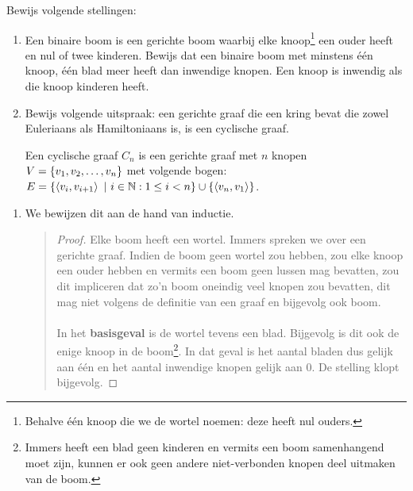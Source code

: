 \documentclass{article}
\begin{document}
\begin{question}[Beslisbaarheid]
\begin{answer}
\begin{itemize}
\end{itemize}
\end{answer}
\end{question}

\begin{question}[Grafentheorie]
Bewijs volgende stellingen:
\begin{enumerate}
\item Een binaire boom is een gerichte boom waarbij elke knoop\footnote{Behalve \'e\'en knoop die we de wortel noemen: deze heeft nul ouders.} een
ouder heeft en nul of twee kinderen. Bewijs dat een binaire boom met
minstens \'e\'en knoop, \'e\'en blad meer heeft dan inwendige knopen.
Een knoop is inwendig als die knoop kinderen heeft.

\item Bewijs volgende uitspraak: een gerichte graaf die een kring
bevat die zowel Euleriaans als Hamiltoniaans is, is een cyclische
graaf.
  \begin{definition}
   Een cyclische graaf $C_n$ is een gerichte graaf met $n$ knopen $V=\left\{ v_1,v_2,\ldots,v_n \right\}$ met volgende bogen: $E=\left\{ \left\langle v_i,v_{i+1} \right\rangle\ |\ i\in\mathbb{N}:1\leq i< n \right\}\cup\left\{ \left\langle v_n,v_1 \right\rangle \right\}$.
  \end{definition}
\end{enumerate}
\begin{answer}
\begin{enumerate}
 \item We bewijzen dit aan de hand van inductie.
 \begin{quote}\begin{proof}
  Elke boom heeft een wortel. Immers spreken we over een gerichte graaf. Indien de boom geen wortel zou hebben, zou elke knoop een ouder hebben en vermits een boom geen lussen mag bevatten, zou dit impliceren dat zo'n boom oneindig veel knopen zou bevatten, dit mag niet volgens de definitie van een graaf en bijgevolg ook boom.
  \paragraph{}
  In het \textbf{basisgeval} is de wortel tevens een blad. Bijgevolg is dit ook de enige knoop in de boom\footnote{Immers heeft een blad geen kinderen en vermits een boom samenhangend moet zijn, kunnen er ook geen andere niet-verbonden knopen deel uitmaken van de boom.}. In dat geval is het aantal bladen dus gelijk aan \'e\'en en het aantal inwendige knopen gelijk aan $0$. De stelling klopt bijgevolg.

\end{proof}
\end{quote}
\end{enumerate}
\end{answer}
\end{question}
\end{document}
